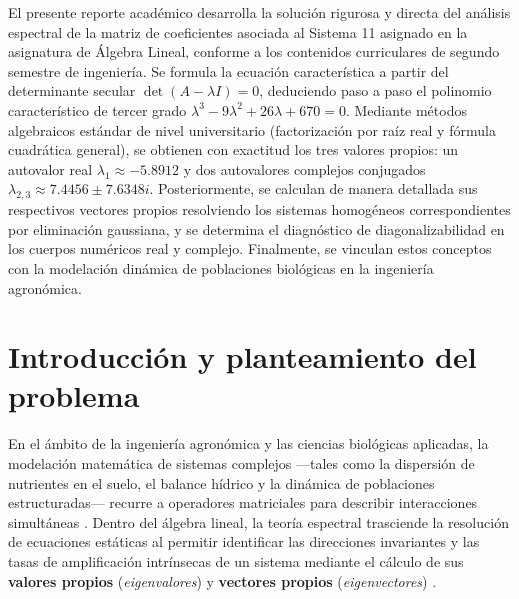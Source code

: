 \documentclass[spanish,letterpaper,oneside]{article}
\begin{document}
\templatePortrait
\templatePagecfg
\onehalfspacing

\begin{abstractd}
El presente reporte académico desarrolla la solución rigurosa y directa del análisis espectral de la matriz de coeficientes asociada al Sistema 11 asignado en la asignatura de Álgebra Lineal, conforme a los contenidos curriculares de segundo semestre de ingeniería. Se formula la ecuación característica a partir del determinante secular $\det(A - \lambda I) = 0$, deduciendo paso a paso el polinomio característico de tercer grado $\lambda^3 - 9\lambda^2 + 26\lambda + 670 = 0$. Mediante métodos algebraicos estándar de nivel universitario (factorización por raíz real y fórmula cuadrática general), se obtienen con exactitud los tres valores propios: un autovalor real $\lambda_1 \approx -5.8912$ y dos autovalores complejos conjugados $\lambda_{2,3} \approx 7.4456 \pm 7.6348i$. Posteriormente, se calculan de manera detallada sus respectivos vectores propios resolviendo los sistemas homogéneos correspondientes por eliminación gaussiana, y se determina el diagnóstico de diagonalizabilidad en los cuerpos numéricos real y complejo. Finalmente, se vinculan estos conceptos con la modelación dinámica de poblaciones biológicas en la ingeniería agronómica.
\end{abstractd}

\templateIndex
\templateFinalcfg

\section{Introducción y planteamiento del problema}

En el ámbito de la ingeniería agronómica y las ciencias biológicas aplicadas, la modelación matemática de sistemas complejos —tales como la dispersión de nutrientes en el suelo, el balance hídrico y la dinámica de poblaciones estructuradas— recurre a operadores matriciales para describir interacciones simultáneas \citep{lay2016,caswell2001}. Dentro del álgebra lineal, la teoría espectral trasciende la resolución de ecuaciones estáticas al permitir identificar las direcciones invariantes y las tasas de amplificación intrínsecas de un sistema mediante el cálculo de sus \textbf{valores propios} (\emph{eigenvalores}) y \textbf{vectores propios} (\emph{eigenvectores}) \citep{anton2014,strang2016}.
\end{document}
